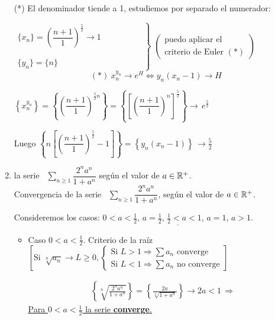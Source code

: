\documentclass[12pt]{article}
\begin{document}
\begin{ejercicio}[2 puntos]
\begin{enumerate}
      	  	(*) El denominador tiende a 1, estudiemos por separado el numerador:
      	  	
      	  	$\left.\begin{array}{l}
			\{x_n\} = \left(\dfrac{n+1}{1}\right)^\frac{5}{2} \longrightarrow 1
			 \\\\\\
			\{y_n\}= \{n\}
			\end{array}\hspace{2cm}\right\}$  $\left( \begin{array}{c}
				\text{puedo aplicar el} \\
				\text{criterio de Euler $(\ast)$}
			\end{array}\right)$\\
	
			\[
			(\ast) \ x_n ^{y_n} \longrightarrow e^H \Longleftrightarrow y_n(x_n-1) \longrightarrow H
			\]			
		
			$\left\{x_n^{y_n}\right\} = \left\{\left(\dfrac{n+1}{1}\right)^{\frac{5}{2}n}\right\} = \left\{\left[\left(\dfrac{n+1}{1}\right)^{n}\right]^\frac{5}{2}\right\} \longrightarrow \, e^\frac{5}{2}$
			
			Luego $\left\{n\left[\left(\dfrac{n+1}{1}\right)^{\frac{5}{2}}-1\right]\right\} = \left\{y_n(x_n-1)\right\} \, \longrightarrow \frac{5}{2}$
			
			\item la serie \ $\displaystyle \sum\limits_{n\geq 1} \dfrac{2^na^n}{1+a^n}$ según el valor de $a \in {\mathbb{R}}^+$. \\
			Convergencia de la serie \ $\displaystyle \sum\limits_{n\geq 1} \dfrac{2^na^n}{1+a^n}$, según el valor de $a \in {\mathbb{R}}^+$.
			
			Consideremos los casos: $\underline{0 < a < \frac{1}{2}, \, a=\frac{1}{2}, \, \frac{1}{2} < a < 1, \, a=1, \, a>1.}$
			\begin{itemize}[]
				\item[\textasteriskcentered] Caso $0 < a < \frac{1}{2}$. Criterio de la raíz $\left[ \text{Si } \sqrt[n]{a_n} \rightarrow L \geq 0, 
				\begin{cases}
					\text{Si } L > 1 \Rightarrow \sum a_n \text{ converge} \\
					\text{Si } L < 1 \Rightarrow \sum a_n \text{ no converge}
				\end{cases}
				\right]$
				
				\begin{gather*}
					\left\{ \sqrt[n]{\frac{2^na^n}{1+a^n}} \right\} = \left\{\frac{2a}{\sqrt[n]{1+a^n}}\right\} \rightarrow 2a<1 \, \Rightarrow 
				\end{gather*}
				\underline{\underline{Para $0 < a < \frac{1}{2}$ la serie \textbf{converge}.}}
				

\end{itemize}
\end{enumerate}
\end{ejercicio}
\end{document}
